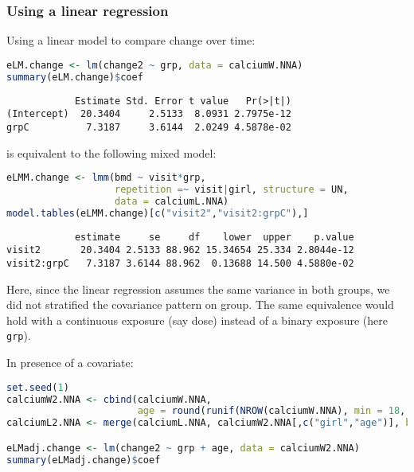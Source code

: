 \documentclass[12pt]{article}
\begin{document}
\clearpage
\subsubsection{Using a linear regression}
\label{sec:org35cc122}

Using a linear model to compare change over time:
\begin{lstlisting}[language=r,numbers=none]
eLM.change <- lm(change2 ~ grp, data = calciumW.NNA)
summary(eLM.change)$coef
\end{lstlisting}

\label{}
\begin{verbatim}
            Estimate Std. Error t value   Pr(>|t|)
(Intercept)  20.3404     2.5133  8.0931 2.7975e-12
grpC          7.3187     3.6144  2.0249 4.5878e-02
\end{verbatim}


is equivalent to the following mixed model:
\begin{lstlisting}[language=r,numbers=none]
eLMM.change <- lmm(bmd ~ visit*grp,
                   repetition =~ visit|girl, structure = UN,
                   data = calciumL.NNA)
model.tables(eLMM.change)[c("visit2","visit2:grpC"),]
\end{lstlisting}

\label{}
\begin{verbatim}
            estimate     se     df    lower  upper    p.value
visit2       20.3404 2.5133 88.962 15.34654 25.334 2.8044e-12
visit2:grpC   7.3187 3.6144 88.962  0.13688 14.500 4.5880e-02
\end{verbatim}


Here, since the linear regression assumes the same variance in both
groups, we did not stratified the covariance pattern on group. The
same equivalence would hold with a continuous exposure (say dose)
instead of a binary exposure (here \texttt{grp}).

\bigskip

In presence of a covariate:
\begin{lstlisting}[language=r,numbers=none]
set.seed(1)
calciumW2.NNA <- cbind(calciumW.NNA,
                       age = round(runif(NROW(calciumW.NNA), min = 18, max = 60)))
calciumL2.NNA <- merge(calciumL.NNA, calciumW2.NNA[,c("girl","age")], by = "girl")

eLMadj.change <- lm(change2 ~ grp + age, data = calciumW2.NNA)
summary(eLMadj.change)$coef
\end{lstlisting}
\end{document}
